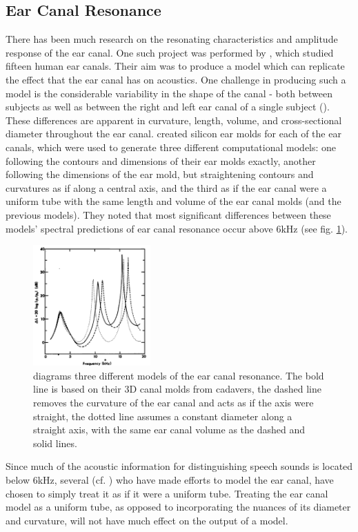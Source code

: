 \documentclass[dissertation,copyright]{uathesis}
\begin{document}
\subsection{Ear Canal Resonance}
There has been much research on the resonating characteristics and amplitude response of the ear canal.  One such project was performed by \cite{stinson:89}, which studied fifteen human ear canals.  Their aim was to produce a model which can replicate the effect that the ear canal has on acoustics.
One challenge in producing such a model is the considerable variability in the shape of the canal - both between subjects as well as between the right and left ear canal of a single subject (\cite{stinson:89}).  These differences are apparent in curvature, length, volume, and cross-sectional diameter throughout the ear canal.  \cite{stinson:89} created silicon ear molds for each of the ear canals, which were used to generate three different computational models: one following the contours and dimensions of their ear molds exactly, another following the dimensions of the ear mold, but straightening contours and curvatures as if along a central axis, and the third as if the ear canal were a uniform tube with the same length and volume of the ear canal molds (and the previous models).  They noted that most significant differences between these models' spectral predictions of ear canal resonance occur above 6kHz (see fig. \ref{fig:eac_modelling}).  
%
\begin{figure}
\centering
  \includegraphics[width=0.4\textwidth]{figure/eac_mod_diffs.png}
  \caption{\cite{stinson:89} diagrams three different models of the ear canal resonance.  The bold line is based on their 3D canal molds from cadavers, the dashed line removes the curvature of the ear canal and acts as if the axis were straight, the dotted line assumes a constant diameter along a straight axis, with the same ear canal volume as the dashed and solid lines.}
  \label{fig:eac_modelling}
\end{figure}
%
Since much of the acoustic information for distinguishing speech sounds is located below 6kHz, several (cf. \cite{stinson:89,hansen:97b,stenfelt:07}) who have made efforts to model the ear canal, have chosen to simply treat it as if it were a uniform tube.  Treating the ear canal model as a uniform tube, as opposed to incorporating the nuances of its diameter and curvature, will not have much effect on the output of a model.
\end{document}
